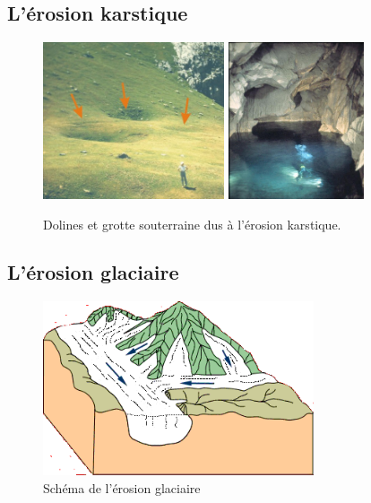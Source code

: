 \documentclass{beamer}
\begin{document}
\subsection{L'érosion karstique}
\begin{frame}
  \begin{center}
    \begin{figure}[h]
      \includegraphics[width=5.35cm]{Images/Diapos/Erosion/Karstique/dolines.jpg}
      \includegraphics[width=4cm]{Images/Diapos/Erosion/Karstique/erosion-karstique-fig04.jpg}
      \caption{Dolines et grotte souterraine dus à l'érosion karstique.}
    \end{figure}
  \end{center}
\end{frame}

\subsection{L'érosion glaciaire}
\begin{frame}
  \begin{center}
    \begin{figure}
      \includegraphics[width=8cm]{Images/Diapos/Erosion/Glaciaire/Erosion_glaciaire_Bourque4B.png}
      \caption{Schéma de l'érosion glaciaire}
    \end{figure}
  \end{center}
\end{frame}
\end{document}
